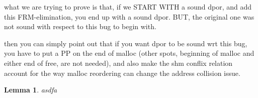 \documentclass[pldi]{sigplanconf-pldi15}
\newtheorem{lemma}{Lemma}
\begin{document}
%
%

what we are trying to prove is that, if we START WITH a sound dpor, and add this FRM-elimination, you end up with a sound dpor. BUT, the original one was not sound with respect to this bug to begin with.

then you can simply point out that if you want dpor to be sound wrt this bug, you have to put a PP on the end of malloc (other spots, beginning of malloc and either end of free, are not needed), and also make the shm conflix relation account for the way malloc reordering can change the address collision issue.


\begin{lemma}
	asdfa
	\label{lem:leia} %
\end{lemma}



%
%
%
%
%
%
%
%
%
\end{document}
